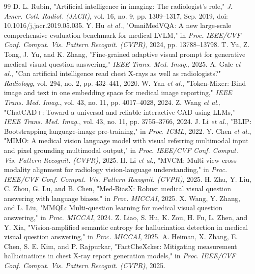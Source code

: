 \documentclass[journal,twoside,web]{ieeecolor}
\begin{document}
\begin{thebibliography}{99}
 D. L. Rubin, "Artificial intelligence in imaging: The radiologist's role," \textit{J. Amer. Coll. Radiol. (JACR)}, vol. 16, no. 9, pp. 1309--1317, Sep. 2019, doi: 10.1016/j.jacr.2019.05.035.
 Y. Hu \textit{et al.}, "OmniMedVQA: A new large-scale comprehensive evaluation benchmark for medical LVLM," in \textit{Proc. IEEE/CVF Conf. Comput. Vis. Pattern Recognit. (CVPR)}, 2024, pp. 13788--13798.
 T. Yu, Z. Tong, J. Yu, and K. Zhang, "Fine-grained adaptive visual prompt for generative medical visual question answering," \textit{IEEE Trans. Med. Imag.}, 2025.
 A. Gale \textit{et al.}, "Can artificial intelligence read chest X-rays as well as radiologists?" \textit{Radiology}, vol. 294, no. 2, pp. 432--441, 2020.
 W. Yan \textit{et al.}, "Token-Mixer: Bind image and text in one embedding space for medical image reporting," \textit{IEEE Trans. Med. Imag.}, vol. 43, no. 11, pp. 4017--4028, 2024.
 Z. Wang \textit{et al.}, "ChatCAD+: Toward a universal and reliable interactive CAD using LLMs," \textit{IEEE Trans. Med. Imag.}, vol. 43, no. 11, pp. 3755--3766, 2024.
 J. Li \textit{et al.}, "BLIP: Bootstrapping language-image pre-training," in \textit{Proc. ICML}, 2022.
 Y. Chen \textit{et al.}, "MIMO: A medical vision language model with visual referring multimodal input and pixel grounding multimodal output," in \textit{Proc. IEEE/CVF Conf. Comput. Vis. Pattern Recognit. (CVPR)}, 2025.
 H. Li \textit{et al.}, "MVCM: Multi-view cross-modality alignment for radiology vision-language understanding," in \textit{Proc. IEEE/CVF Conf. Comput. Vis. Pattern Recognit. (CVPR)}, 2025.
 H. Zhu, Y. Liu, C. Zhou, G. Lu, and B. Chen, "Med-BiasX: Robust medical visual question answering with language biases," in \textit{Proc. MICCAI}, 2025.
 X. Wang, Y. Zhang, and L. Liu, "MMQL: Multi-question learning for medical visual question answering," in \textit{Proc. MICCAI}, 2024.
 Z. Liao, S. Hu, K. Zou, H. Fu, L. Zhen, and Y. Xia, "Vision-amplified semantic entropy for hallucination detection in medical visual question answering," in \textit{Proc. MICCAI}, 2025.
 A. Heiman, X. Zhang, E. Chen, S. E. Kim, and P. Rajpurkar, "FactCheXcker: Mitigating measurement hallucinations in chest X-ray report generation models," in \textit{Proc. IEEE/CVF Conf. Comput. Vis. Pattern Recognit. (CVPR)}, 2025.

\end{thebibliography}
\end{document}
